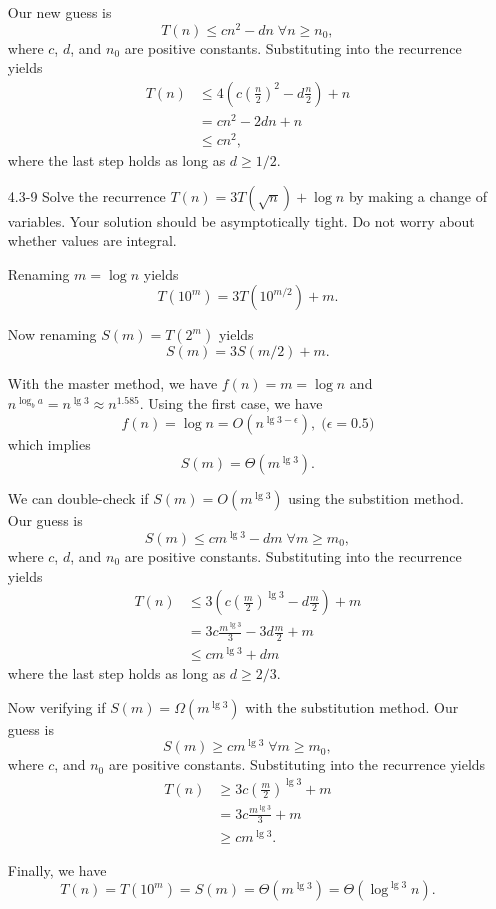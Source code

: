 \documentclass{report}
\makeatletter
\renewenvironment{framed}{%
 \def\FrameCommand##1{\hskip\@totalleftmargin
 \fboxsep=\FrameSep\fbox{##1}}%
 \MakeFramed {\advance\hsize-\width
   \@totalleftmargin\z@ \linewidth\hsize
   \@setminipage}}%
 {\par\unskip\endMakeFramed}
\DeclareMathOperator{\Forall}{\forall}
\makeatother
\begin{document}
\begin{enumerate}
\begin{framed}
Our new guess is
\[
T(n) \le c n^2 - dn \; \Forall n \ge n_0,
\]
where $c$, $d$, and $n_0$ are positive constants. Substituting into the
recurrence yields
\begin{equation*}
\begin{aligned}
T(n) &\le 4 \left(c \left(\frac{n}{2}\right)^2 - d\frac{n}{2} \right) + n\\
     &= c n^2 - 2dn + n\\
     &\le c n^2,
\end{aligned}
\end{equation*}
where the last step holds as long as $d \ge 1/2$.
\end{framed}

\item[4.3{-}9]{Solve the recurrence $T(n) = 3T(\sqrt{n}) + \log n$ by making
a change of variables.  Your solution should be asymptotically tight. Do not
worry about whether values are integral.}

\begin{framed}
Renaming $m = \log n$ yields
\[
T(10^m) = 3T(10^{m/2}) + m.
\]

Now renaming $S(m) = T(2^m)$ yields
\[
S(m) = 3S(m/2) + m.
\]

With the master method, we have $f(n) = m = \log n$ and
$n^{\log_b a} = n^{\lg 3} \approx n^{1.585}$. Using the first case, we have
\[
f(n) = \log n = O(n^{\lg 3 - \epsilon}), \; \text{($\epsilon = 0.5$)}
\]
which implies
\[
S(m) = \Theta(m^{\lg 3}).
\]

We can double-check if $S(m) = O(m^{\lg 3})$ using the substition method. Our
guess is
\[
S(m) \le c m^{\lg 3} - dm \; \Forall m \ge m_0,
\]
where $c$, $d$, and $n_0$ are positive constants. Substituting into the
recurrence yields
\begin{equation*}
\begin{aligned}
T(n) &\le 3 \left(c \left(\frac{m}{2}\right)^{\lg 3} - d \frac{m}{2}\right) + m\\
     &= 3 c \frac{m^{\lg 3}}{3} - 3d\frac{m}{2} + m\\
     &\le c m^{\lg 3} + dm
\end{aligned}
\end{equation*}
where the last step holds as long as $d \ge 2/3$.

Now verifying if $S(m) = \Omega(m^{\lg 3})$ with the substitution method. Our
guess is
\[
S(m) \ge c m^{\lg 3} \; \Forall m \ge m_0,
\]
where $c$, and $n_0$ are positive constants. Substituting into the
recurrence yields
\begin{equation*}
\begin{aligned}
T(n) &\ge 3 c \left(\frac{m}{2}\right)^{\lg 3} + m\\
     &= 3 c \frac{m^{\lg 3}}{3} + m\\
     &\ge c m^{\lg 3}.
\end{aligned}
\end{equation*}

Finally, we have
\[
T(n) = T(10^m) = S(m) = \Theta(m^{\lg 3}) = \Theta(\log^{\lg 3} n).
\]

\end{framed}

\end{enumerate}
\end{document}
